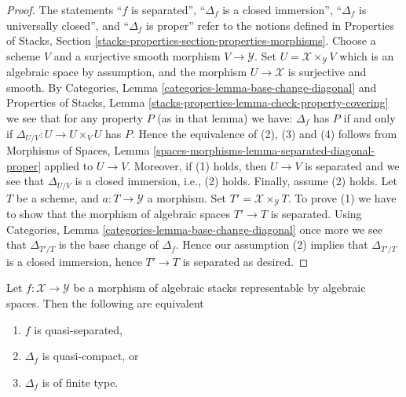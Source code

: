 \begin{proof}
The statements
``$f$ is separated'',
``$\Delta_f$ is a closed immersion'',
``$\Delta_f$ is universally closed'', and
``$\Delta_f$ is proper''
refer to the notions defined in
Properties of Stacks,
Section \ref{stacks-properties-section-properties-morphisms}.
Choose a scheme $V$ and a surjective smooth morphism $V \to \mathcal{Y}$.
Set $U = \mathcal{X} \times_\mathcal{Y} V$ which is an algebraic
space by assumption, and the morphism $U \to \mathcal{X}$ is surjective
and smooth. By
Categories, Lemma \ref{categories-lemma-base-change-diagonal}
and
Properties of Stacks,
Lemma \ref{stacks-properties-lemma-check-property-covering}
we see that for any property $P$ (as in that lemma) we have:
$\Delta_f$ has $P$ if and only if $\Delta_{U/V} : U \to  U \times_V U$ has $P$.
Hence the equivalence of (2), (3) and (4) follows from
Morphisms of Spaces,
Lemma \ref{spaces-morphisms-lemma-separated-diagonal-proper}
applied to $U \to V$.
Moreover, if (1) holds, then $U \to V$ is separated and we see that
$\Delta_{U/V}$ is a closed immersion, i.e., (2) holds.
Finally, assume (2) holds. Let $T$ be a scheme, and $a : T \to \mathcal{Y}$
a morphism. Set $T' = \mathcal{X} \times_\mathcal{Y} T$. To prove
(1) we have to show that the morphism of algebraic spaces $T' \to T$
is separated. Using
Categories, Lemma \ref{categories-lemma-base-change-diagonal}
once more we see that $\Delta_{T'/T}$ is the base change of
$\Delta_f$. Hence our assumption (2) implies that $\Delta_{T'/T}$
is a closed immersion, hence $T' \to T$ is separated as desired.
\end{proof}

\begin{lemma}
\label{lemma-representable-quasi-separated-diagonal-quasi-compact}
Let $f : \mathcal{X} \to \mathcal{Y}$ be a morphism of algebraic stacks
representable by algebraic spaces. Then the following are equivalent
\begin{enumerate}
\item $f$ is quasi-separated,
\item $\Delta_f$ is quasi-compact, or
\item $\Delta_f$ is of finite type.
\end{enumerate}
\end{lemma}

